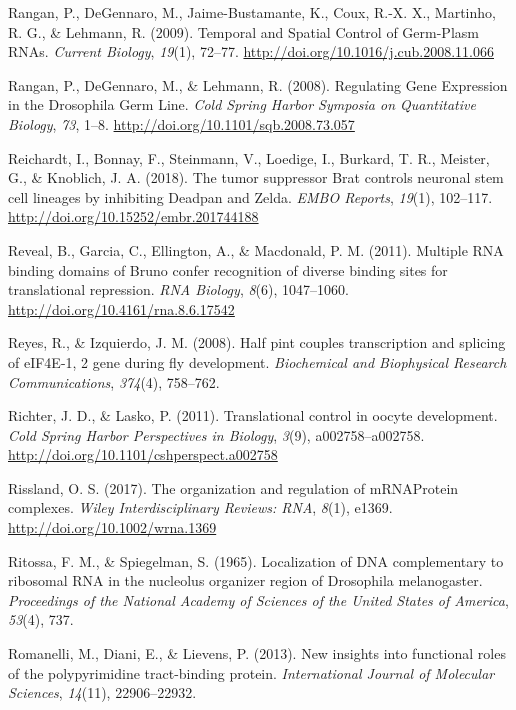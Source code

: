\documentclass[12pt,twoside]{reedthesis}
\newlength{\cslhangindent}
\newenvironment{cslreferences}%
  {\setlength{\parindent}{0pt}%
  \everypar{\setlength{\hangindent}{\cslhangindent}}\ignorespaces}%
  {\par}
\begin{document}
\begin{cslreferences}
\leavevmode\hypertarget{ref-Rangan2009}{}%
Rangan, P., DeGennaro, M., Jaime-Bustamante, K., Coux, R.-X. X., Martinho, R. G., \& Lehmann, R. (2009). Temporal and Spatial Control of Germ-Plasm RNAs. \emph{Current Biology}, \emph{19}(1), 72--77. \url{http://doi.org/10.1016/j.cub.2008.11.066}

\leavevmode\hypertarget{ref-Rangan2008}{}%
Rangan, P., DeGennaro, M., \& Lehmann, R. (2008). Regulating Gene Expression in the Drosophila Germ Line. \emph{Cold Spring Harbor Symposia on Quantitative Biology}, \emph{73}, 1--8. \url{http://doi.org/10.1101/sqb.2008.73.057}

\leavevmode\hypertarget{ref-Reichardt2018d}{}%
Reichardt, I., Bonnay, F., Steinmann, V., Loedige, I., Burkard, T. R., Meister, G., \& Knoblich, J. A. (2018). The tumor suppressor Brat controls neuronal stem cell lineages by inhibiting Deadpan and Zelda. \emph{EMBO Reports}, \emph{19}(1), 102--117. \url{http://doi.org/10.15252/embr.201744188}

\leavevmode\hypertarget{ref-Reveal2011j}{}%
Reveal, B., Garcia, C., Ellington, A., \& Macdonald, P. M. (2011). Multiple RNA binding domains of Bruno confer recognition of diverse binding sites for translational repression. \emph{RNA Biology}, \emph{8}(6), 1047--1060. \url{http://doi.org/10.4161/rna.8.6.17542}

\leavevmode\hypertarget{ref-Reyes2008}{}%
Reyes, R., \& Izquierdo, J. M. (2008). Half pint couples transcription and splicing of eIF4E-1, 2 gene during fly development. \emph{Biochemical and Biophysical Research Communications}, \emph{374}(4), 758--762.

\leavevmode\hypertarget{ref-Richter2011j}{}%
Richter, J. D., \& Lasko, P. (2011). Translational control in oocyte development. \emph{Cold Spring Harbor Perspectives in Biology}, \emph{3}(9), a002758--a002758. \url{http://doi.org/10.1101/cshperspect.a002758}

\leavevmode\hypertarget{ref-Rissland2017k}{}%
Rissland, O. S. (2017). The organization and regulation of mRNAProtein complexes. \emph{Wiley Interdisciplinary Reviews: RNA}, \emph{8}(1), e1369. \url{http://doi.org/10.1002/wrna.1369}

\leavevmode\hypertarget{ref-Ritossa1965a}{}%
Ritossa, F. M., \& Spiegelman, S. (1965). Localization of DNA complementary to ribosomal RNA in the nucleolus organizer region of Drosophila melanogaster. \emph{Proceedings of the National Academy of Sciences of the United States of America}, \emph{53}(4), 737.

\leavevmode\hypertarget{ref-Romanelli2013}{}%
Romanelli, M., Diani, E., \& Lievens, P. (2013). New insights into functional roles of the polypyrimidine tract-binding protein. \emph{International Journal of Molecular Sciences}, \emph{14}(11), 22906--22932.


\end{cslreferences}
\end{document}
